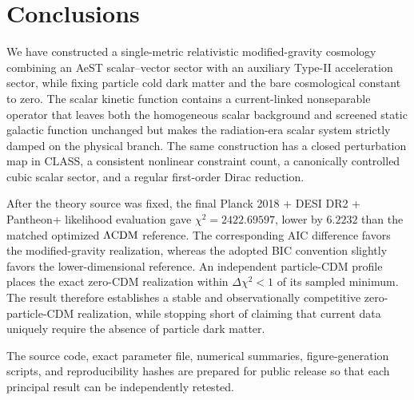\section{Conclusions}\label{sec:conclusion}
We have constructed a single-metric relativistic modified-gravity cosmology combining an AeST scalar--vector sector with an auxiliary Type-II acceleration sector, while fixing particle cold dark matter and the bare cosmological constant to zero. The scalar kinetic function contains a current-linked nonseparable operator that leaves both the homogeneous scalar background and screened static galactic function unchanged but makes the radiation-era scalar system strictly damped on the physical branch. The same construction has a closed perturbation map in CLASS, a consistent nonlinear constraint count, a canonically controlled cubic scalar sector, and a regular first-order Dirac reduction.

After the theory source was fixed, the final Planck 2018 + DESI DR2 + Pantheon+ likelihood evaluation gave $\chi^2=2422.69597$, lower by $6.2232$ than the matched optimized $\Lambda\mathrm{CDM}$ reference. The corresponding AIC difference favors the modified-gravity realization, whereas the adopted BIC convention slightly favors the lower-dimensional reference. An independent particle-CDM profile places the exact zero-CDM realization within $\Delta\chi^2<1$ of its sampled minimum. The result therefore establishes a stable and observationally competitive zero-particle-CDM realization, while stopping short of claiming that current data uniquely require the absence of particle dark matter.

The source code, exact parameter file, numerical summaries, figure-generation scripts, and reproducibility hashes are prepared for public release so that each principal result can be independently retested.
